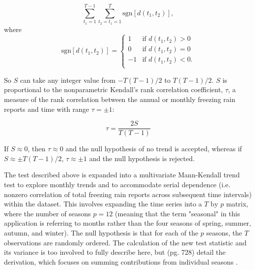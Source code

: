 \documentclass[twocol]{ametsoc}
\begin{document}
\[\sum_{t_1=1}^{T-1}\sum_{t_2=t_1=1}^T\text{sgn}[d(t_1,t_2)],\] where\\

\[\text{sgn}[d(t_1,t_2)]=\begin{cases} 1 & \text{if } d(t_1,t_2)>0\\ 0 & \text{if } d(t_1,t_2)=0\\ -1 & \text{if } d(t_1,t_2)<0.\\ \end{cases}\]

So $S$ can take any integer value from $-T(T-1)/2$ to $T(T-1)/2$. $S$ is proportional to the nonparametric Kendall's rank correlation coefficient, $\tau$, a measure of the rank correlation between the annual or monthly freezing rain reports and time with range $\tau=\pm1$:

\[\tau=\frac{2S}{T(T-1)}\]

If $S\approx0$, then $\tau\approx0$ and the null hypothesis of no trend is accepted, whereas if  $S\approx\pm T(T-1)/2$, $\tau\approx\pm1$ and the null hypothesis is rejected. 

The test described above is expanded into a multivariate Mann-Kendall trend test to explore monthly trends and to accommodate serial dependence (i.e. nonzero correlation of total freezing rain reports across subsequent time intervals) within the dataset. This involves expanding the time series into a $T\text{ by }p$ matrix, where the number of seasons $p=12$ (meaning that the term "seasonal" in this application is referring to months rather than the four seasons of spring, summer, autumn, and winter). The null hypothesis is that for each of the $p$ seasons, the $T$ observations are randomly ordered. The calculation of the new test statistic and its variance is too involved to fully describe here, but \citet{hirsch1984nonparametric} (pg. 728) detail the derivation, which focuses on summing contributions from individual seasons .
\end{document}
